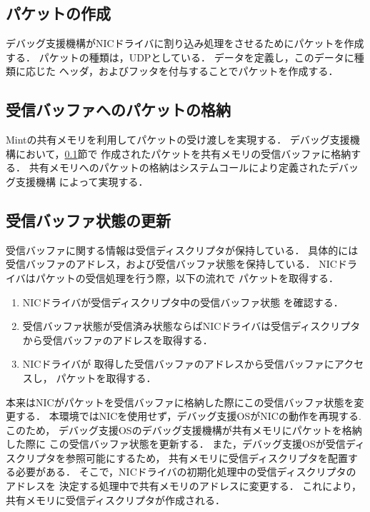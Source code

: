\documentclass[tanilab-enum]{graduate}
\begin{document}
\subsection{パケットの作成}\label{packet}
デバッグ支援機構がNICドライバに割り込み処理をさせるためにパケットを作成する．
パケットの種類は，UDPとしている．
データを定義し，このデータに種類に応じた
ヘッダ，およびフッタを付与することでパケットを作成する．
\subsection{受信バッファへのパケットの格納}
Mintの共有メモリを利用してパケットの受け渡しを実現する．
デバッグ支援機構において，\ref{packet}節で
作成されたパケットを共有メモリの受信バッファに格納する．
共有メモリへのパケットの格納はシステムコールにより定義されたデバッグ支援機構
によって実現する．
\subsection{受信バッファ状態の更新}
受信バッファに関する情報は受信ディスクリプタが保持している．
具体的には受信バッファのアドレス，および受信バッファ状態を保持している．
NICドライバはパケットの受信処理を行う際，以下の流れで
パケットを取得する．
\begin{enumerate}
    \item 
        NICドライバが受信ディスクリプタ中の受信バッファ状態
        を確認する．
    \item
        受信バッファ状態が受信済み状態ならばNICドライバは受信ディスクリプタ
        から受信バッファのアドレスを取得する．
    \item
        NICドライバが
        取得した受信バッファのアドレスから受信バッファにアクセスし，
        パケットを取得する．
\end{enumerate}
本来はNICがパケットを受信バッファに格納した際にこの受信バッファ状態を変更する．
本環境ではNICを使用せず，デバッグ支援OSがNICの動作を再現する.
このため，
デバッグ支援OSのデバッグ支援機構が共有メモリにパケットを格納した際に
この受信バッファ状態を更新する．
また，デバッグ支援OSが受信ディスクリプタを参照可能にするため，
共有メモリに受信ディスクリプタを配置する必要がある．
そこで，NICドライバの初期化処理中の受信ディスクリプタのアドレスを
決定する処理中で共有メモリのアドレスに変更する．
これにより，共有メモリに受信ディスクリプタが作成される．
\end{document}
